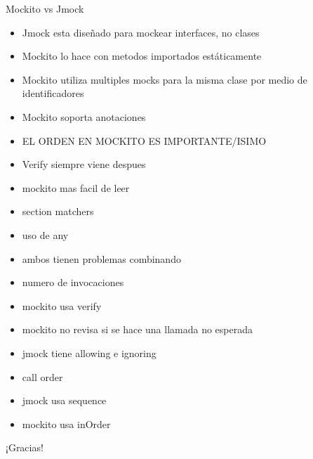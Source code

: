 \documentclass[]{beamer}
\newcommand{\fondoTitulo}{%
  \usebackgroundtemplate{\texttt{[image: fondo]}}}
\begin{document}
\begin{frame}{Mockito vs Jmock}
  \begin{itemize}
  \item Jmock esta diseñado para mockear interfaces, no clases
  \item Mockito lo hace con metodos importados estáticamente
  \item Mockito utiliza multiples mocks para la misma clase por medio de identificadores
  \item Mockito soporta anotaciones
  \item EL ORDEN EN MOCKITO ES IMPORTANTE/ISIMO
  \item Verify siempre viene despues
  \item mockito mas facil de leer
    \item section matchers
    \item uso de any
    \item ambos tienen problemas combinando
  \item numero de invocaciones
    \item mockito usa verify
    \item mockito no revisa si se hace una llamada no esperada
    \item jmock tiene allowing e ignoring
  \item call order
  \item jmock usa sequence
    \item mockito usa inOrder
  \end{itemize}
  \transboxout
\end{frame}









\begin{frame}[c]
   \begin{center}
     \LARGE ¡Gracias!
   \end{center}    
\end{frame}
\end{document}
